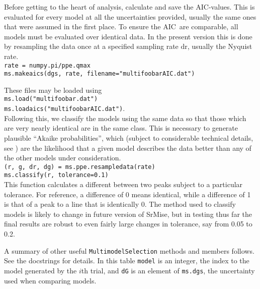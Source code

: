 \documentclass[12pt]{article}
\newcommand{\aic}{\ensuremath{\mathrm{AIC}}}
\begin{document}
Before getting to the heart of analysis, calculate and save the \aic-values.  This is evaluated for every model at all the uncertainties provided, usually the same ones that were assumed in the first place.  To ensure the \aic~are comparable, all models must be evaluated over identical data.  In the present version this is done by resampling the data once at a specified sampling rate $\textrm{dr}$, usually the Nyquist rate.\\
\texttt{rate = numpy.pi/ppe.qmax}\\
\texttt{ms.makeaics(dgs, rate, filename="multifoobarAIC.dat")}


These files may be loaded using\\
\texttt{ms.load("multifoobar.dat")}\\
\texttt{ms.loadaics("multifoobarAIC.dat")}.\\
Following this, we classify the models using the same data so that those which are very nearly identical are in the same class.  This is necessary to generate plausible ``Akaike probabilities'', which (subject to considerable technical details, see ) are the likelihood that a given model describes the data better than any of the other models under consideration.\\
\texttt{(r, g, dr, dg) = ms.ppe.resampledata(rate)}\\
\texttt{ms.classify(r, tolerance=0.1)}\\
This function calculates a different between two peaks subject to a particular tolerance.  For reference, a difference of 0 means identical, while a difference of 1 is that of a peak to a line that is identically 0.  The method used to classify models is likely to change in future version of {\sc SrMise}, but in testing thus far the final results are robust to even fairly large changes in tolerance, say from 0.05 to 0.2.

A summary of other useful \texttt{MultimodelSelection} methods and members follows.  See the docstrings for details.  In this table \texttt{model} is an integer, the index to the model generated by the $i$th trial, and \texttt{dG} is an element of \texttt{ms.dgs}, the uncertainty used when comparing models.
\end{document}
